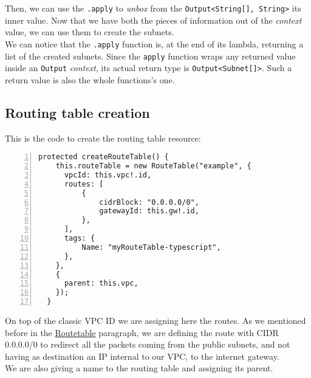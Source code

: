 Then, we can use the \texttt{.apply} to \textit{unbox} from the \texttt{Output<String[], String>} its inner value.
Now that we have both the pieces of information out of the \textit{context} value, we can use them to create the subnets.\\
We can notice that the \texttt{.apply} function is, at the end of its lambda, returning a list of the created subnets.
Since the \texttt{apply} function wraps any returned value inside an \texttt{Output} \textit{context}, its actual return type is \texttt{Output<Subnet[]>}.
Such a return value is also the whole functions's one.

\subsection{Routing table creation}
This is the code to create the routing table resource:\\
\begin{minipage}{\linewidth}
\begin{lstlisting}[numbers=left, numberstyle=\tiny, numbersep=-5pt, stepnumber=1]
  protected createRouteTable() {
    this.routeTable = new RouteTable("example", {
      vpcId: this.vpc!.id,
      routes: [
          {
              cidrBlock: "0.0.0.0/0",
              gatewayId: this.gw!.id,
          },
      ],
      tags: {
          Name: "myRouteTable-typescript",
      },
    },
    {
      parent: this.vpc,
    });
  }
\end{lstlisting}
\end{minipage}
On top of the classic VPC ID we are assigning here the routes.
As we mentioned before in the \hyperref[sssec:routetable]{Routetable} paragraph, we are defining the route with CIDR 0.0.0.0/0 to redirect all the packets coming from the public subnets, and not having as destination an IP internal to our VPC, to the internet gateway.\\
We are also giving a name to the routing table and assigning its parent.


